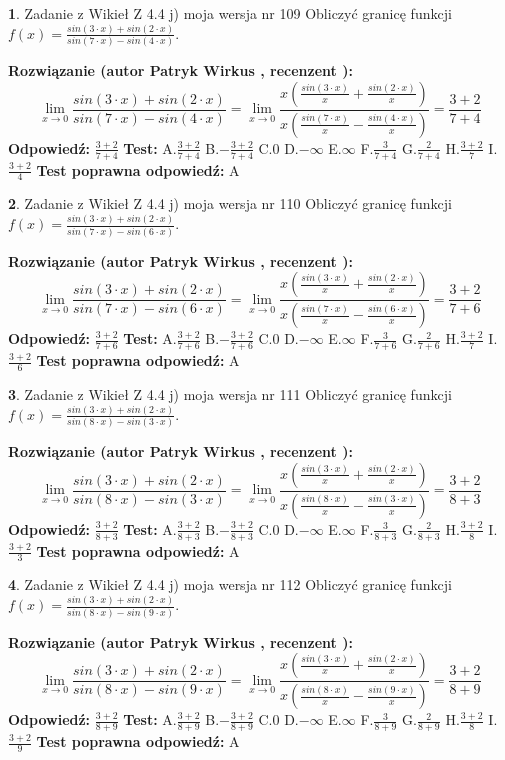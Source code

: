 \documentclass[12pt, a4paper]{article}
\theoremstyle{definition} %
\newtheorem{zad}{}
\newcommand{\zadStart}[1]{\begin{zad}#1\newline}
\newcommand{\zadStop}{\end{zad}}
\newcommand{\rozwStart}[2]{\noindent \textbf{Rozwiązanie (autor #1 , recenzent #2): }\newline}
\newcommand{\rozwStop}{\newline}
\newcommand{\odpStart}{\noindent \textbf{Odpowiedź:}\newline}
\newcommand{\odpStop}{\newline}
\newcommand{\testStart}{\noindent \textbf{Test:}\newline}
\newcommand{\testStop}{\newline}
\newcommand{\kluczStart}{\noindent \textbf{Test poprawna odpowiedź:}\newline}
\newcommand{\kluczStop}{\newline}
\begin{document}
\zadStart{Zadanie z Wikieł Z 4.4 j) moja wersja nr 109}
Obliczyć granicę funkcji $f(x)=\frac{sin(3\cdot x) +sin(2\cdot x)}{sin(7\cdot x) -sin(4\cdot x)}$.
\zadStop
\rozwStart{Patryk Wirkus}{}
$$\lim\limits_{x\to 0}\frac{sin(3\cdot x) +sin(2\cdot x)}{sin(7\cdot x) -sin(4\cdot x)}=\lim\limits_{x\to 0}\frac{x(\frac{sin(3\cdot x)}{x}+\frac{sin(2\cdot x)}{x})}{x(\frac{sin(7\cdot x)}{x}-\frac{sin(4\cdot x)}{x})}=\frac{3+2}{7+4}$$
\rozwStop
\odpStart
$\frac{3+2}{7+4}$
\odpStop
\testStart
A.$\frac{3+2}{7+4}$
B.$-\frac{3+2}{7+4}$
C.$0$
D.$-\infty$
E.$\infty$
F.$\frac{3}{7+4}$
G.$\frac{2}{7+4}$
H.$\frac{3+2}{7}$
I.$\frac{3+2}{4}$
\testStop
\kluczStart
A
\kluczStop



\zadStart{Zadanie z Wikieł Z 4.4 j) moja wersja nr 110}
Obliczyć granicę funkcji $f(x)=\frac{sin(3\cdot x) +sin(2\cdot x)}{sin(7\cdot x) -sin(6\cdot x)}$.
\zadStop
\rozwStart{Patryk Wirkus}{}
$$\lim\limits_{x\to 0}\frac{sin(3\cdot x) +sin(2\cdot x)}{sin(7\cdot x) -sin(6\cdot x)}=\lim\limits_{x\to 0}\frac{x(\frac{sin(3\cdot x)}{x}+\frac{sin(2\cdot x)}{x})}{x(\frac{sin(7\cdot x)}{x}-\frac{sin(6\cdot x)}{x})}=\frac{3+2}{7+6}$$
\rozwStop
\odpStart
$\frac{3+2}{7+6}$
\odpStop
\testStart
A.$\frac{3+2}{7+6}$
B.$-\frac{3+2}{7+6}$
C.$0$
D.$-\infty$
E.$\infty$
F.$\frac{3}{7+6}$
G.$\frac{2}{7+6}$
H.$\frac{3+2}{7}$
I.$\frac{3+2}{6}$
\testStop
\kluczStart
A
\kluczStop



\zadStart{Zadanie z Wikieł Z 4.4 j) moja wersja nr 111}
Obliczyć granicę funkcji $f(x)=\frac{sin(3\cdot x) +sin(2\cdot x)}{sin(8\cdot x) -sin(3\cdot x)}$.
\zadStop
\rozwStart{Patryk Wirkus}{}
$$\lim\limits_{x\to 0}\frac{sin(3\cdot x) +sin(2\cdot x)}{sin(8\cdot x) -sin(3\cdot x)}=\lim\limits_{x\to 0}\frac{x(\frac{sin(3\cdot x)}{x}+\frac{sin(2\cdot x)}{x})}{x(\frac{sin(8\cdot x)}{x}-\frac{sin(3\cdot x)}{x})}=\frac{3+2}{8+3}$$
\rozwStop
\odpStart
$\frac{3+2}{8+3}$
\odpStop
\testStart
A.$\frac{3+2}{8+3}$
B.$-\frac{3+2}{8+3}$
C.$0$
D.$-\infty$
E.$\infty$
F.$\frac{3}{8+3}$
G.$\frac{2}{8+3}$
H.$\frac{3+2}{8}$
I.$\frac{3+2}{3}$
\testStop
\kluczStart
A
\kluczStop



\zadStart{Zadanie z Wikieł Z 4.4 j) moja wersja nr 112}
Obliczyć granicę funkcji $f(x)=\frac{sin(3\cdot x) +sin(2\cdot x)}{sin(8\cdot x) -sin(9\cdot x)}$.
\zadStop
\rozwStart{Patryk Wirkus}{}
$$\lim\limits_{x\to 0}\frac{sin(3\cdot x) +sin(2\cdot x)}{sin(8\cdot x) -sin(9\cdot x)}=\lim\limits_{x\to 0}\frac{x(\frac{sin(3\cdot x)}{x}+\frac{sin(2\cdot x)}{x})}{x(\frac{sin(8\cdot x)}{x}-\frac{sin(9\cdot x)}{x})}=\frac{3+2}{8+9}$$
\rozwStop
\odpStart
$\frac{3+2}{8+9}$
\odpStop
\testStart
A.$\frac{3+2}{8+9}$
B.$-\frac{3+2}{8+9}$
C.$0$
D.$-\infty$
E.$\infty$
F.$\frac{3}{8+9}$
G.$\frac{2}{8+9}$
H.$\frac{3+2}{8}$
I.$\frac{3+2}{9}$
\testStop
\kluczStart
A
\kluczStop
\end{document}
